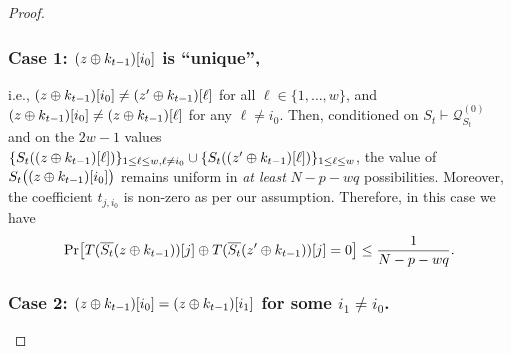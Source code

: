 \begin{proof}
\reducespace

\subsubsection{Case 1: $(z\oplus k_{t-1})[i_0]$ is ``unique'',}

i.e., $(z\oplus k_{t-1})[i_0]\neq(z'\oplus k_{t-1})[\ell]$ for all $\ell\in\{1,\ldots,w\}$, and $(z\oplus k_{t-1})[i_0]\neq(z\oplus k_{t-1})[\ell]$ for any $\ell\neq i_0$. Then, conditioned on $S_t\vdash\mathcal{Q}_{S_t}^{(0)}$ and on the $2w-1$ values $\{S_t((z\oplus k_{t-1})[\ell])\}_{1\leq \ell\leq w,\ell\neq i_0}\cup\{S_t((z'\oplus k_{t-1})[\ell])\}_{1\leq \ell\leq w}$, the value of $S_t\big((z\oplus k_{t-1})[i_0]\big)$ remains uniform in {\it at least} $N-p-wq$ possibilities. Moreover, the coefficient $t_{j,i_0}$ is non-zero as per our assumption. Therefore, in this case we have
%
\begin{align}
{\Pr}\big[T(\overline{S_t}(z\oplus k_{t-1}))[j]\oplus T(\overline{S_t}(z'\oplus k_{t-1}))[j]=0\big]\leq\frac{1}{N-p-wq}.
\label{eq:bound-eq-B33}
\end{align}
%


\reducespace

\reducespace

\reducespace

\subsubsection{Case 2: $(z\oplus k_{t-1})[i_0]=(z\oplus k_{t-1})[i_1]$ for some $i_1\neq i_0$.}


\end{proof}
